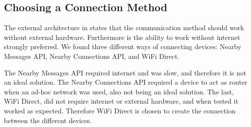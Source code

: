 \subsection{Choosing a Connection Method}
The external architecture in  states that the communication method should work without external hardware.
Furthermore is the ability to work without internet strongly preferred.
We found three different ways of connecting devices: Nearby Messages API, Nearby Connections API, and WiFi Direct.

The Nearby Messages API required internet and was slow, and therefore it is not an ideal solution.
The Nearby Connections API required a device to act as router when an ad-hoc network was used, also not being an ideal solution.
The last, WiFi Direct, did not require internet or external hardware, and when tested it worked as expected.
Therefore WiFi Direct is chosen to create the connection between the different devices.
